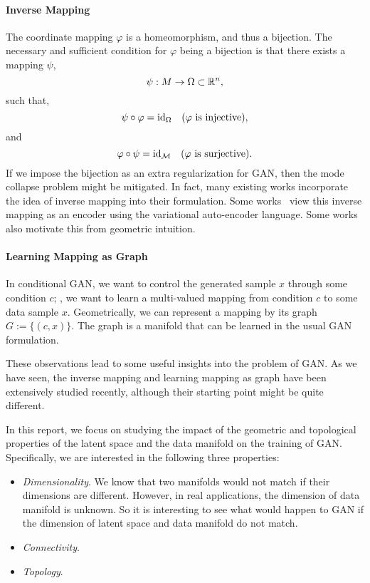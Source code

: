\paragraph{Inverse Mapping}
The coordinate mapping $\varphi$ is a homeomorphism,
and thus a bijection.
The necessary and sufficient condition for $\varphi$ being a bijection is
that there exists a mapping $\psi$,
\begin{equation}
    \psi:M\to \Omega\subset{\mathbb{R}}^n,
\end{equation}
such that,
\begin{equation}
    \psi\circ\varphi = {\mathop{\mathrm{id}}}_\Omega \quad
    (\varphi\text{ is injective}),
\end{equation}
and
\begin{equation}
    \varphi\circ\psi = {\mathop{\mathrm{id}}}_{\mathcal{M}} \quad
    (\varphi\text{ is surjective}).
\end{equation}
If we impose the bijection as an extra regularization for GAN,
then the mode collapse problem might be mitigated.
In fact,
many existing works incorporate the idea of
inverse mapping into their formulation.
Some works~\cite{huang2016stacked,che2016mode,kim2017learning,perarnau2016invertible}
view this inverse mapping as an encoder using the
variational auto-encoder language.
Some works~\cite{zhu2016generative,zhu2017unpaired} also
motivate this from geometric intuition.

\paragraph{Learning Mapping as Graph}
In conditional GAN,
we want to control the generated sample $x$ through some condition $c$;
\ie,
we want to learn a multi-valued mapping from condition $c$ to
some data sample $x$.
Geometrically,
we can represent a mapping by its graph $G:=\{(c,x)\}$.
The graph is a manifold that can be learned in the usual GAN formulation.

These observations lead to some useful insights into the problem of GAN.
As we have seen,
the inverse mapping and learning mapping as graph have been
extensively studied recently,
although their starting point might be quite different.

In this report,
we focus on studying the impact of the geometric and topological
properties of the latent space and the data manifold on the training of GAN.
Specifically,
we are interested in the following three properties:
\begin{itemize}
    \item \emph{Dimensionality}.
        We know that two manifolds would not match
        if their dimensions are different.
        However, in real applications,
        the dimension of data manifold is unknown.
        So it is interesting to see what would happen to GAN if the dimension
        of latent space and data manifold do not match.
    \item \emph{Connectivity}.
    \item \emph{Topology}.
\end{itemize}
